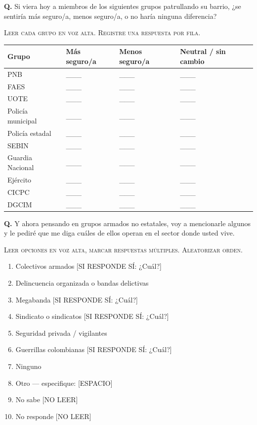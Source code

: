 \documentclass[11pt,letterpaper]{article}
\newcounter{question}
\newcommand{\question}[1]{%
  \stepcounter{question}%
  \vspace{0.3em}%
  \noindent\textbf{Q\thequestion.} #1%
}
\newcommand{\instruction}[1]{%
  \vspace{0.1em}%
  \noindent\textsc{\small #1}%
  \vspace{0.1em}%
}
\newenvironment{responses}
{\begin{enumerate}[label=(\arabic*), leftmargin=2em, itemsep=0em, parsep=0em, topsep=0em]}
{\end{enumerate}\vspace{0.3em}}
\begin{document}
\question{Si viera hoy a miembros de los siguientes grupos patrullando su barrio, ¿se sentiría más seguro/a, menos seguro/a, o no haría ninguna diferencia?}

\instruction{Leer cada grupo en voz alta. Registre una respuesta por fila.}

\vspace{0.3em}
\begin{tabular}{p{4cm}p{3.5cm}p{3.5cm}p{3.5cm}}
\textbf{Grupo} & \textbf{Más seguro/a} & \textbf{Menos seguro/a} & \textbf{Neutral / sin cambio} \\
\midrule
PNB & \_\_\_ & \_\_\_ & \_\_\_ \\
FAES & \_\_\_ & \_\_\_ & \_\_\_ \\
UOTE & \_\_\_ & \_\_\_ & \_\_\_ \\
Policía municipal & \_\_\_ & \_\_\_ & \_\_\_ \\
Policía estadal & \_\_\_ & \_\_\_ & \_\_\_ \\
SEBIN & \_\_\_ & \_\_\_ & \_\_\_ \\
Guardia Nacional & \_\_\_ & \_\_\_ & \_\_\_ \\
Ejército & \_\_\_ & \_\_\_ & \_\_\_ \\
CICPC & \_\_\_ & \_\_\_ & \_\_\_ \\
DGCIM & \_\_\_ & \_\_\_ & \_\_\_ \\
\end{tabular}


\question{Y ahora pensando en grupos armados no estatales, voy a mencionarle algunos y le pediré que me diga cuáles de ellos operan en el sector donde usted vive.}

\instruction{Leer opciones en voz alta, marcar respuestas múltiples. Aleatorizar orden.}
\begin{responses}
\item Colectivos armados [SI RESPONDE SÍ: ¿Cuál?]
\item Delincuencia organizada o bandas delictivas
\item Megabanda [SI RESPONDE SÍ: ¿Cuál?]
\item Sindicato o sindicatos [SI RESPONDE SÍ: ¿Cuál?]
\item Seguridad privada / vigilantes
\item Guerrillas colombianas [SI RESPONDE SÍ: ¿Cuál?]
\item Ninguno
\item Otro — especifique: [ESPACIO]
\item[(98)] No sabe [NO LEER]
\item[(99)] No responde [NO LEER]
\end{responses}
\end{document}
